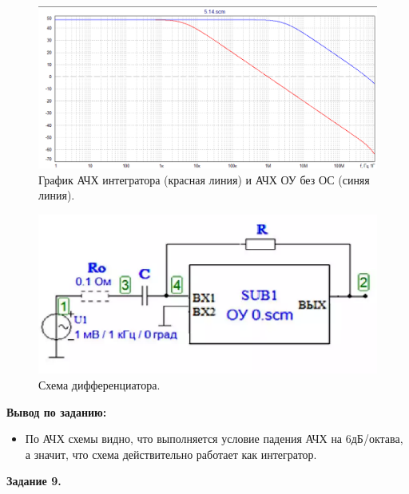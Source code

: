 \documentclass[a4paper,14pt]{extarticle}
\begin{document}
    \begin{figure}[h!]
        \begin{center}
            \includegraphics[scale=0.6]{20.png}
        \end{center}
        \vspace{-0.7cm}
        \caption{График АЧХ интегратора (красная линия) и АЧХ ОУ без ОС (синяя линия).}
    \end{figure}

    \begin{figure}[h!]
        \begin{center}
            \includegraphics[scale=0.6]{21.png}
        \end{center}
        \vspace{-0.7cm}
        \caption{ Схема дифференциатора.}
    \end{figure}

    \textbf{Вывод по заданию:}

    \begin{itemize}
        \item По АЧХ схемы видно, что выполняется условие падения АЧХ на 6дБ/октава, а значит, что схема действительно работает как интегратор.
    \end{itemize}

    \newpage
    \begin{center}
        \textbf{Задание 9.}
    \end{center}
\end{document}
